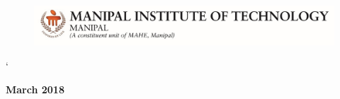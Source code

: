 \documentclass[runningheads,a4paper,12pt]{report}
\begin{document}
\begin{titlepage}
\begin{center}
\end{center}


\begin{figure}[h]
  \begin{center}
	\includegraphics[scale=1]{MITLogo}
	\end{center}
	\end{figure}`
	\begin{center}
	\textbf{March 2018}
	\end{center}
\end{titlepage}

\newpage





\listoftables
{}
\listoffigures
\tableofcontents
{}






\renewcommand{\bibname}{References} %
\end{document}
